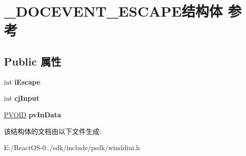 \hypertarget{struct___d_o_c_e_v_e_n_t___e_s_c_a_p_e}{}\section{\+\_\+\+D\+O\+C\+E\+V\+E\+N\+T\+\_\+\+E\+S\+C\+A\+P\+E结构体 参考}
\label{struct___d_o_c_e_v_e_n_t___e_s_c_a_p_e}
\subsection*{Public 属性}
\begin{DoxyCompactItemize}
\item 
\mbox{\label{struct___d_o_c_e_v_e_n_t___e_s_c_a_p_e_a69c903f5b83c3ab4807e2994272ab3d5}} 
int {\bfseries i\+Escape}
\item 
\mbox{\label{struct___d_o_c_e_v_e_n_t___e_s_c_a_p_e_a0e9bf24c85521c427ba2b8702e87b23e}} 
int {\bfseries cj\+Input}
\item 
\mbox{\label{struct___d_o_c_e_v_e_n_t___e_s_c_a_p_e_a1037415ae3a1a237f0eb64cf3136d465}} 
\hyperlink{interfacevoid}{P\+V\+O\+ID} {\bfseries pv\+In\+Data}
\end{DoxyCompactItemize}


该结构体的文档由以下文件生成\+:\begin{DoxyCompactItemize}
\item 
E\+:/\+React\+O\+S-\/0../sdk/include/psdk/winddiui.\+h\end{DoxyCompactItemize}
